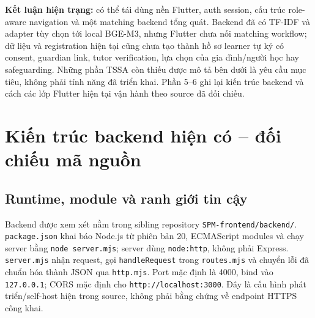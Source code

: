 \documentclass[11pt,a4paper]{article}
\begin{document}
\textbf{Kết luận hiện trạng:} có thể tái dùng nền Flutter, auth session, cấu trúc role-aware navigation và một matching backend tổng quát. Backend đã có TF-IDF và adapter tùy chọn tới local BGE-M3, nhưng Flutter chưa nối matching workflow; dữ liệu và registration hiện tại cũng chưa tạo thành hồ sơ learner tự kỷ có consent, guardian link, tutor verification, lựa chọn của gia đình/người học hay safeguarding. Những phần TSSA còn thiếu được mô tả bên dưới là yêu cầu mục tiêu, không phải tính năng đã triển khai. Phần 5--6 ghi lại kiến trúc backend và cách các lớp Flutter hiện tại vận hành theo source đã đối chiếu.

\section{Kiến trúc backend hiện có -- đối chiếu mã nguồn}

\subsection{Runtime, module và ranh giới tin cậy}
Backend được xem xét nằm trong sibling repository \texttt{SPM-frontend/backend/}. \texttt{package.json} khai báo Node.js từ phiên bản 20, ECMAScript modules và chạy server bằng \texttt{node server.mjs}; server dùng \texttt{node:http}, không phải Express. \texttt{server.mjs} nhận request, gọi \texttt{handleRequest} trong \texttt{routes.mjs} và chuyển lỗi đã chuẩn hóa thành JSON qua \texttt{http.mjs}. Port mặc định là 4000, bind vào \texttt{127.0.0.1}; CORS mặc định cho \texttt{http://localhost:3000}. Đây là cấu hình phát triển/self-host hiện trong source, không phải bằng chứng về endpoint HTTPS công khai.
\end{document}
